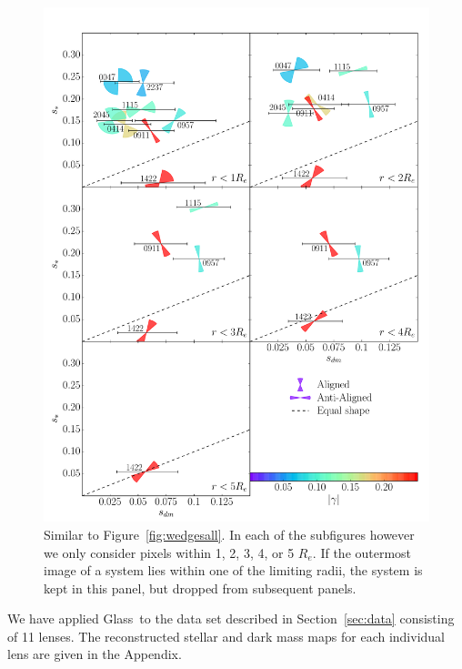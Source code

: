 \documentclass[useAMS,usenatbib]{mn2e}
\def\Glass{{\sc Glass}}
\begin{document}
\begin{figure}
  \centering
  \includegraphics[width=.75\linewidth]{Figures/wedges.pdf}
  \caption[width=\linewidth]{Similar to Figure~\ref{fig:wedgesall}. In each of the subfigures however we only consider pixels within 1, 2, 3, 4, or 5 $R_e$. If the outermost image of a system lies within one of the limiting radii, the system is kept in this panel, but dropped from subsequent panels.}
  \label{fig:wedgesradii}
\end{figure}

We have applied \Glass\ to the data set described in Section~\ref{sec:data} consisting of 11 lenses. The reconstructed stellar and dark mass maps for each individual lens are given in the Appendix.
\end{document}
